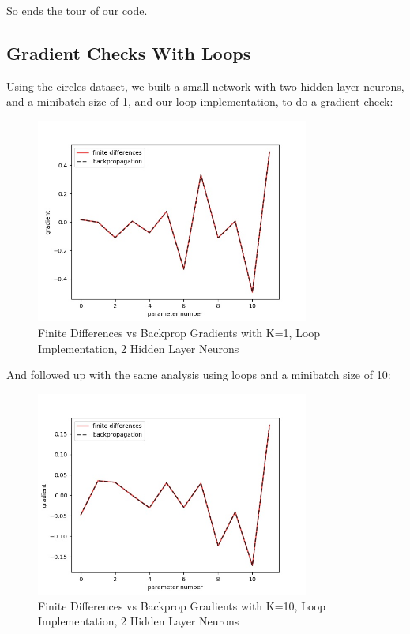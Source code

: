\documentclass[reqno]{amsart}
\theoremstyle{definition}
\theoremstyle{remark}
\numberwithin{equation}{section}
\begin{document}
So ends the tour of our code.

\subsection{Gradient Checks With Loops}

Using the circles dataset, we built a small network with two hidden layer neurons, and a minibatch size of 1, and our loop implementation, to do a gradient check:

\begin{figure}[H]
    \centering
    \includegraphics[width=0.8\textwidth]{gradient_differences_first-check_k1}
    \caption{Finite Differences vs Backprop Gradients with K=1, Loop Implementation, 2 Hidden Layer Neurons}
    \label{fig:gradient_differences_first-check_k1}
\end{figure}

And followed up with the same analysis using loops and a minibatch size of 10: \\

\begin{figure}[H]
    \centering
    \includegraphics[width=0.8\textwidth]{gradient_differences_loop-added_k10}
    \caption{Finite Differences vs Backprop Gradients with K=10, Loop Implementation, 2 Hidden Layer Neurons}
    \label{fig:gradient_differences_loop-added_k10}
\end{figure}
\end{document}
